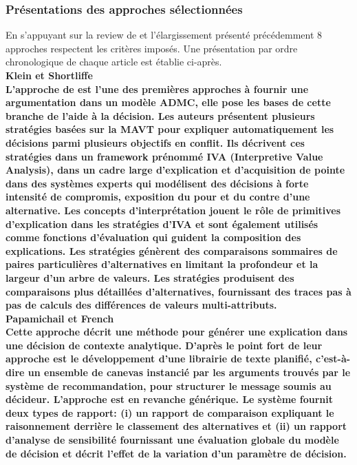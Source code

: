 \documentclass[a4paper, 11pt]{article}
\renewcommand{\textbf}[1]{\begingroup\bfseries\mathversion{bold}#1\endgroup}
\begin{document}
\vspace{.2cm}

\subsubsection{Présentations des approches sélectionnées}

En s'appuyant sur la review de \textcolor{blue}{\citep{NunesJannachUmuai2017}} et l'élargissement présenté précédemment 8 approches respectent les critères imposés. Une présentation par ordre chronologique de chaque article est établie ci-après.\\

\noindent \textbf{Klein et Shortliffe}\\ %

L'approche de \textcolor{blue}{\citep{KLEIN1994201}} est l'une des premières approches à fournir une argumentation dans un modèle ADMC, elle pose les bases de cette branche de l'aide à la décision. Les auteurs présentent plusieurs stratégies basées sur la MAVT pour expliquer automatiquement les décisions parmi plusieurs objectifs en conflit.
Ils décrivent ces stratégies dans un framework prénommé IVA (Interpretive Value Analysis), dans un cadre large d'explication et d'acquisition de pointe dans des systèmes experts qui modélisent des décisions à forte intensité de compromis, exposition du pour et du contre d'une alternative.
Les concepts d'interprétation jouent le rôle de primitives d'explication dans les  stratégies d'IVA  et sont également utilisés comme fonctions d'évaluation qui guident la composition des explications. 
Les stratégies génèrent des comparaisons sommaires de paires particulières d'alternatives en limitant la profondeur et la largeur d'un arbre de valeurs. 
Les stratégies produisent des comparaisons plus détaillées d'alternatives, fournissant des traces pas à pas de calculs des différences de valeurs multi-attributs.\\


\noindent \textbf{Papamichail et French}\\ %

Cette approche décrit une méthode pour générer une explication dans une décision de contexte analytique. D'après \textcolor{blue}{\citep{PAPAMICHAIL200335}} le point fort de leur approche est le développement d'une librairie de texte planifié, c'est-à-dire un ensemble de canevas instancié par les arguments trouvés par le système de recommandation, pour structurer le message soumis au décideur. L'approche est en revanche générique. Le système fournit deux types de rapport: (i) un rapport de  comparaison expliquant le raisonnement derrière le classement des alternatives et (ii) un rapport d'analyse de sensibilité fournissant une évaluation globale du modèle de décision et décrit l'effet de la variation d'un paramètre de décision.
\end{document}
